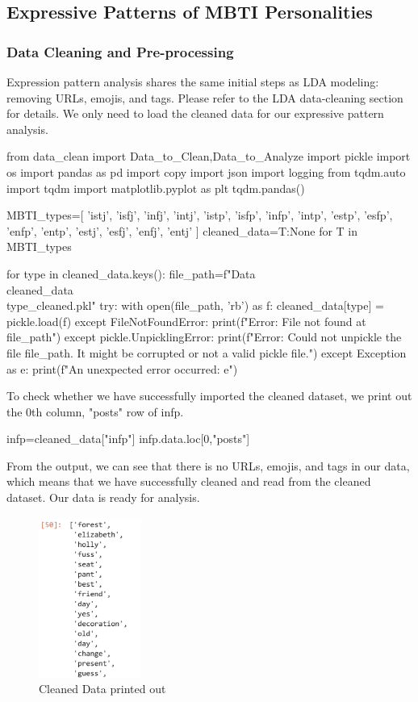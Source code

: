 \documentclass[12pt]{article}
\begin{document}
	\subsection{Expressive Patterns of MBTI Personalities}
	\subsubsection{Data Cleaning and Pre-processing}
	Expression pattern analysis shares the same initial steps as LDA modeling: removing URLs, emojis, and tags. Please refer to the LDA data-cleaning section for details. We only need to load the cleaned data for our expressive pattern analysis.
	\begin{python}
from data_clean import Data_to_Clean,Data_to_Analyze
import pickle
import os
import pandas as pd
import copy
import json
import logging
from tqdm.auto import tqdm
import matplotlib.pyplot as plt
tqdm.pandas()

MBTI_types=[
    'istj', 'isfj', 'infj', 'intj', 
    'istp', 'isfp', 'infp', 'intp', 
    'estp', 'esfp', 'enfp', 'entp', 
    'estj', 'esfj', 'enfj', 'entj'
    ]
cleaned_data={T:None for T in MBTI_types}

for type in cleaned_data.keys():
    file_path=f"Data\\cleaned_data\\{type}_cleaned.pkl" 
    try:
        with open(file_path, 'rb') as f:
            cleaned_data[type] = pickle.load(f)
    except FileNotFoundError:
        print(f"Error: File not found at {file_path}")
    except pickle.UnpicklingError:
        print(f"Error: Could not unpickle the file {file_path}. It might be corrupted or not a valid pickle file.")
    except Exception as e:
        print(f"An unexpected error occurred: {e}")
	\end{python}
	
	To check whether we have successfully imported the cleaned dataset, we print out the 0th column,  "posts" row of infp.
	\begin{python}
infp=cleaned_data["infp"]
infp.data.loc[0,"posts"]
	\end{python}
	
	From the output, we can see that there is no URLs, emojis, and tags in our data, which means that we have successfully cleaned and read from the cleaned dataset. Our data is ready for analysis.
	\begin{figure}[H]
		\centering
		\includegraphics[width=0.3\textwidth]{Q2VADER1} 
		\caption{Cleaned Data printed out}		
	\end{figure}
	
\end{document}
